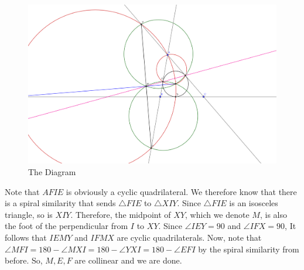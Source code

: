 \documentclass[10pt]{../usamts}
\begin{document}
\begin{solution}
\begin{figure}
\includegraphics[width=12cm]{round2/p4diagram.png}
\caption{The Diagram}
\end{figure}

Note that $AFIE$ is obviously a cyclic quadrilateral. We therefore know that there is a spiral similarity that sends $\triangle FIE$ to $\triangle XIY$. Since $\triangle FIE$ is an isosceles triangle, so is $XIY$. Therefore, the midpoint of $XY$, which we denote $M$, is also the foot of the perpendicular from $I$ to $XY$. Since $\angle IEY = 90$ and $\angle IFX = 90$, It follows that $IEMY$ and $IFMX$ are cyclic quadrilaterals. Now, note that $\angle MFI = 180 - \angle MXI = 180 - \angle YXI = 180 - \angle EFI$ by the spiral similarity from before. So, $M,E,F$ are collinear and we are done.
\end{solution}
\end{document}
